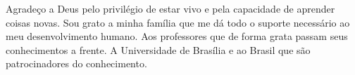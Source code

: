 Agradeço a Deus pelo privilégio de estar vivo e pela capacidade de aprender coisas novas. Sou grato a minha família que me dá todo o suporte
necessário ao meu desenvolvimento humano. Aos professores que de forma grata passam seus conhecimentos a frente. A Universidade de Brasília e ao Brasil que são patrocinadores do conhecimento. 
 